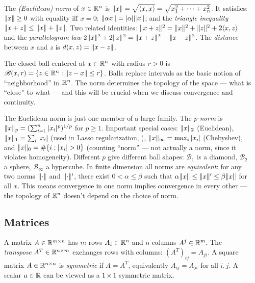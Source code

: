 \begin{defn}\label{def:norm-distance}
	The \textit{(Euclidean) norm} of $x \in \mathbb{R}^n$ is $\lVert x\rVert = \sqrt{\langle x, x\rangle} = \sqrt{x_1^2 + \cdots + x_n^2}$.
	It satisfies: $\lVert x\rVert \geq 0$ with equality iff $x = 0$; $\lVert\alpha x\rVert = \lvert\alpha\rvert \lVert x\rVert$; and the \textit{triangle inequality} $\lVert x + z\rVert \leq \lVert x\rVert + \lVert z\rVert$.
	Two related identities: $\lVert x + z\rVert^2 = \lVert x\rVert^2 + \lVert z\rVert^2 + 2\langle x, z\rangle$ and the \textit{parallelogram law} $2\lVert x\rVert^2 + 2\lVert z\rVert^2 = \lVert x + z\rVert^2 + \lVert x - z\rVert^2$.
	The \textit{distance} between $x$ and $z$ is $d(x, z) = \lVert x - z\rVert$.
\end{defn}

\begin{defn}[Ball]\label{def:ball}
	The closed ball centered at $x \in \mathbb{R}^n$ with radius $r > 0$ is
	$\mathcal{B}(x, r) = \{z \in \mathbb{R}^n : \lVert z - x\rVert \leq r\}$.
	Balls replace intervals as the basic notion of ``neighborhood'' in $\mathbb{R}^n$.
	The norm determines the topology of the space --- what is ``close'' to what --- and this will be crucial when we discuss convergence and continuity.
\end{defn}


The Euclidean norm is just one member of a large family.
The \textit{$p$-norm} is $\lVert x\rVert_p = (\sum_{i=1}^{n} |x_i|^p)^{1/p}$ for $p \geq 1$.
Important special cases: $\lVert x\rVert_2$ (Euclidean), $\lVert x\rVert_1 = \sum_i |x_i|$ (used in Lasso regularization, ), $\lVert x\rVert_\infty = \max_i |x_i|$ (Chebyshev), and $\lVert x\rVert_0 = \#\{i : |x_i| > 0\}$ (counting ``norm'' --- not actually a norm, since it violates homogeneity).
Different $p$ give different ball shapes: $\mathcal{B}_1$ is a diamond, $\mathcal{B}_2$ a sphere, $\mathcal{B}_\infty$ a hypercube.
In finite dimension all norms are \textit{equivalent}: for any two norms $\lVert\cdot\rVert$ and $\lVert\cdot\rVert'$, there exist $0 < \alpha \leq \beta$ such that $\alpha\lVert x\rVert \leq \lVert x\rVert' \leq \beta\lVert x\rVert$ for all $x$.
This means convergence in one norm implies convergence in every other --- the topology of $\mathbb{R}^n$ doesn't depend on the choice of norm.


\subsection{Matrices}\label{ssec:matrices}

A matrix $A \in \mathbb{R}^{m \times n}$ has $m$ rows $A_i \in \mathbb{R}^n$ and $n$ columns $A^j \in \mathbb{R}^m$.
The \textit{transpose} $A^T \in \mathbb{R}^{n \times m}$ exchanges rows with columns: $(A^T)_{ij} = A_{ji}$.
A square matrix $A \in \mathbb{R}^{n \times n}$ is \textit{symmetric} if $A = A^T$, equivalently $A_{ij} = A_{ji}$ for all $i, j$.
A scalar $a \in \mathbb{R}$ can be viewed as a $1 \times 1$ symmetric matrix.

